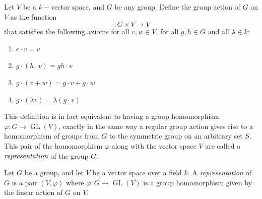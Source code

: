 \begin{definition}
    Let $V$ be a $k-$vector space, and $G$ be any group. Define the group action of $G$ on $V$ as the function 
    \[
    \cdot: G \times V \to V
    \]
    that satisfies the following axioms for all $v,w \in V$, for all $g,h \in G$ and all $\lambda \in k$:
    \begin{enumerate}
        \item $e \cdot v = v $
        \item $g \cdot (h \cdot v) = gh \cdot v$
        \item $g \cdot (v + w) = g \cdot v + g \cdot w$
        \item $g \cdot ( \lambda v) = \lambda (g \cdot v)$
    \end{enumerate}
\end{definition}
This definition is in fact equivalent to having a group homomorphism $\varphi: G \to \operatorname{GL}(V)$, exactly in the same way a regular group action gives rise to a homomorphism of groups from $G$ to the symmetric group on an arbitrary set $S$. This pair of the homomorphism $\varphi$ along with the vector space $V$ are called a $\emph{representation}$ of the group $G$.
\begin{definition}

Let $G$ be a group, and let $V$ be a vector space over a field $k$. A \emph{representation} of $G$ is a pair $(V, \varphi)$ where $\varphi: G \to \operatorname{GL}(V)$ is a group homomorphism given by the linear action of $G$ on $V$.
\end{definition}

